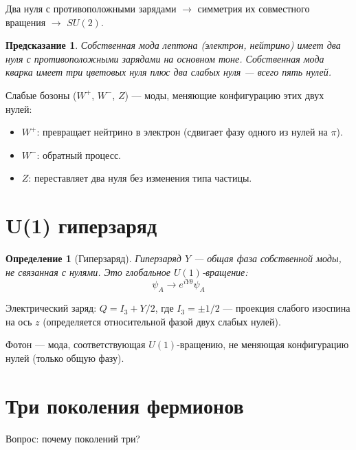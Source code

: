 \documentclass[11pt,a4paper]{article}
\newtheorem{definition}{Определение}[section]
\newtheorem{prediction}{Предсказание}[section]
\theoremstyle{definition}
\begin{document}
Два нуля с противоположными зарядами $\to$ симметрия их совместного вращения $\to$ $SU(2)$.

\begin{prediction}
Собственная мода лептона (электрон, нейтрино) имеет два нуля с противоположными зарядами на основном тоне. Собственная мода кварка имеет три цветовых нуля плюс два слабых нуля — всего пять нулей.
\end{prediction}

Слабые бозоны ($W^+$, $W^-$, $Z$) — моды, меняющие конфигурацию этих двух нулей:
\begin{itemize}
    \item $W^+$: превращает нейтрино в электрон (сдвигает фазу одного из нулей на $\pi$).
    \item $W^-$: обратный процесс.
    \item $Z$: переставляет два нуля без изменения типа частицы.
\end{itemize}

\section{U(1) гиперзаряд}

\begin{definition}[Гиперзаряд]
Гиперзаряд $Y$ — общая фаза собственной моды, не связанная с нулями. Это глобальное $U(1)$-вращение:
\begin{equation}
    \psi_A \to e^{iY\theta} \psi_A
\end{equation}
\end{definition}

Электрический заряд: $Q = I_3 + Y/2$, где $I_3 = \pm 1/2$ — проекция слабого изоспина на ось $z$ (определяется относительной фазой двух слабых нулей).

Фотон — мода, соответствующая $U(1)$-вращению, не меняющая конфигурацию нулей (только общую фазу).

\section{Три поколения фермионов}

Вопрос: почему поколений три?
\end{document}
